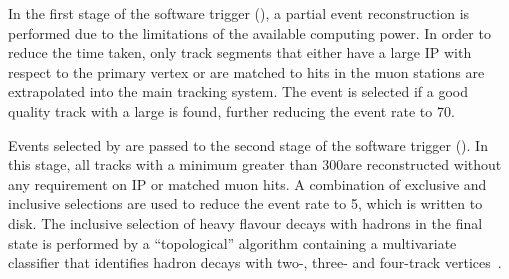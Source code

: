 In the first stage of the software trigger (\hltone), a partial event reconstruction is performed due to the limitations of the available computing power. In order to reduce the time taken, only \velo track segments that either have a large IP with respect to the primary vertex or are matched to hits in the muon stations are extrapolated into the main tracking system. The event is selected if a good quality track with a large \pt is found, further reducing the event rate to 70\khz. 

Events selected by \hltone are passed to the second stage of the software trigger (\hlttwo). In this stage, all tracks with a minimum \pt greater than 300\mevc are reconstructed without any requirement on IP or matched muon hits. A combination of exclusive and inclusive selections are used to reduce the event rate to 5\khz, which is written to disk. The inclusive selection of heavy flavour decays with hadrons in the final state is performed by a ``topological'' algorithm containing a multivariate classifier that identifies \bquark hadron decays with two-, three- and four-track vertices~\cite{trigger-inclusive,trigger-topo}.

